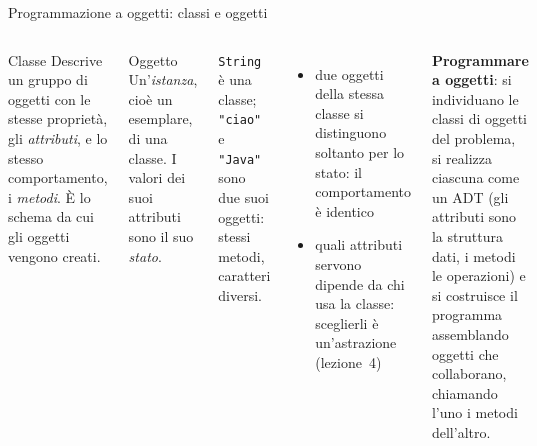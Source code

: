 \documentclass[10pt,aspectratio=169]{beamer}
\begin{document}
\begin{frame}[fragile]{Programmazione a oggetti: classi e oggetti}
\begin{columns}[T]
\begin{block}{Classe}
\small Descrive un gruppo di oggetti con le stesse proprietà, gli \emph{attributi}, e lo stesso comportamento, i \emph{metodi}. È lo schema da cui gli oggetti vengono creati.
\end{block}
\begin{block}{Oggetto}
\small Un'\emph{istanza}, cioè un esemplare, di una classe. I valori dei suoi attributi sono il suo \emph{stato}.
\end{block}

\small
\texttt{String} è una classe; \texttt{"ciao"} e \texttt{"Java"} sono due suoi oggetti: stessi metodi, caratteri diversi.
\begin{itemize}\itemsep=2pt
    \item due oggetti della stessa classe si distinguono soltanto per lo stato: il comportamento è identico
    \item quali attributi servono dipende da chi usa la classe: sceglierli è un'astrazione (lezione~4)
\end{itemize}

\small
\textbf{Programmare a oggetti}: si individuano le classi di oggetti del problema, si realizza ciascuna come un ADT (gli attributi sono la struttura dati, i metodi le operazioni) e si costruisce il programma assemblando oggetti che collaborano, chiamando l'uno i metodi dell'altro.
\end{columns}
\end{frame}
\end{document}
